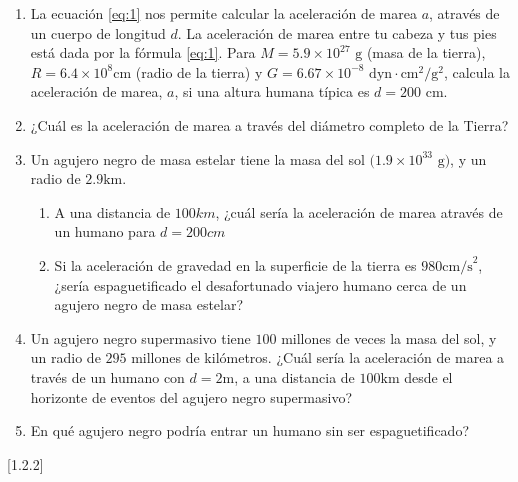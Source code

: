 \documentclass[a4paper]{article}
\newcounter{problema}
\begin{document}
\begin{problema}
    \begin{enumerate}
        \item La ecuación \ref{eq:1} nos permite calcular la aceleración de marea $a$, através de un
        cuerpo de longitud $d$. La aceleración de marea entre tu cabeza y tus pies está dada por la fórmula \ref{eq:1}. 
        Para $M = 5.9\times 10^{27} \text{ g}$ (masa de la tierra), $R=6.4\times 10^8 \text{cm}$ (radio de la tierra) y
        $G=6.67\times 10^{-8} \text{ dyn} \cdot \text{cm}^2/\text{g}^2$, calcula la aceleración de marea, $a$, 
        si una altura humana típica es $d=200\text{ cm}$.
        \item ¿Cuál es la aceleración de marea a través del diámetro completo de la Tierra?
        \item Un agujero negro de masa estelar tiene la masa del sol $(1.9\times 10^{33}\text{ g)}$, 
        y un radio de $2.9 \text{km}$.
        \begin{enumerate}
            \item A una distancia de $100km$, ¿cuál sería la aceleración de marea através de un humano para $d=200cm$
            \item Si la aceleración de gravedad en la superficie de la tierra es $980 	\text{cm/s}^2$, 
            ¿sería espaguetificado el desafortunado viajero humano cerca de un agujero negro de masa estelar?
        \end{enumerate}
        \item Un agujero negro supermasivo tiene $100$ millones de veces la masa del sol, y un radio de $295$ millones de kilómetros.
        ¿Cuál sería la aceleración de marea a través de un humano con $d=2\text{m}$, a una distancia de $100\text{km}$ desde el horizonte 
        de eventos del agujero negro supermasivo?
        \item En qué agujero negro podría entrar un humano sin ser espaguetificado?
    \end{enumerate}
    
\end{problema} [1.2.2]
\end{document}
